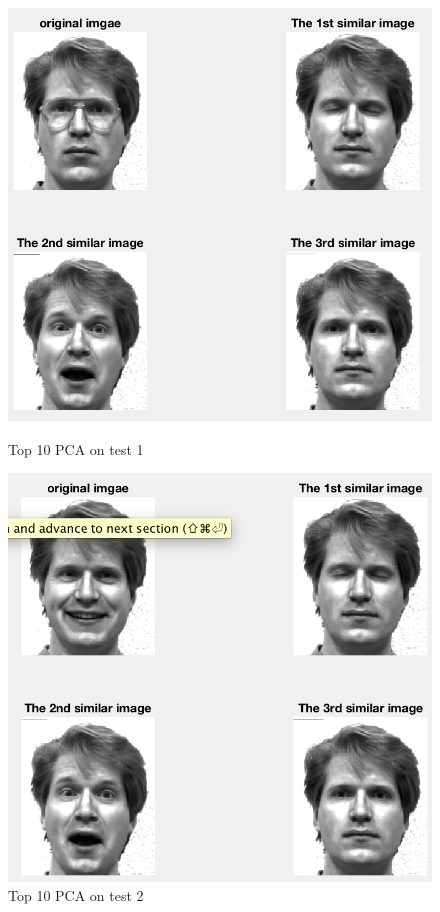 \documentclass{article}
\begin{document}
\begin{figure}[htbp]
\centering
\begin{minipage}[t]{0.48\textwidth}
\centering
\includegraphics[scale = 0.3]{10_1.png}
\caption{Top 10 PCA on test 1}
\end{minipage}
\begin{minipage}[t]{0.48\textwidth}
\centering
\includegraphics[scale = 0.3]{10_2.png}
\caption{Top 10 PCA on test 2}
\end{minipage}
\end{figure}
\end{document}

